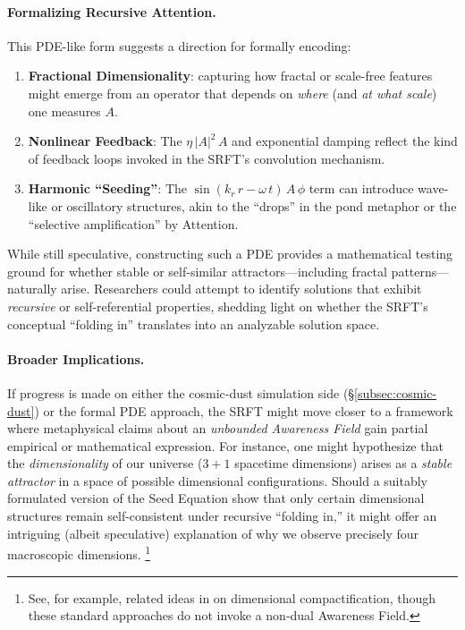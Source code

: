 \documentclass[12pt,a4paper]{article}
\begin{document}
\paragraph{Formalizing Recursive Attention.}
This PDE-like form suggests a direction for formally encoding:
\begin{enumerate}
    \item \textbf{Fractional Dimensionality}: capturing how fractal or scale-free features might emerge from an operator that depends on \emph{where} (and \emph{at what scale}) one measures \(A\).
    \item \textbf{Nonlinear Feedback}: The \(\eta\,|A|^2\,A\) and exponential damping reflect the kind of feedback loops invoked in the SRFT’s convolution mechanism.
    \item \textbf{Harmonic “Seeding”}: The \(\sin(k_r\,r - \omega\,t) \,A\,\phi\) term can introduce wave-like or oscillatory structures, akin to the “drops” in the pond metaphor or the “selective amplification” by Attention.
\end{enumerate}
While still speculative, constructing such a PDE provides a mathematical testing ground for whether stable or self-similar attractors---including fractal patterns---naturally arise. Researchers could attempt to identify solutions that exhibit \emph{recursive} or self-referential properties, shedding light on whether the SRFT’s conceptual “folding in” translates into an analyzable solution space.

\paragraph{Broader Implications.}
If progress is made on either the cosmic-dust simulation side (\S\ref{subsec:cosmic-dust}) or the formal PDE approach, the SRFT might move closer to a framework where metaphysical claims about an \emph{unbounded Awareness Field} gain partial empirical or mathematical expression. For instance, one might hypothesize that the \emph{dimensionality} of our universe (\(3+1\) spacetime dimensions) arises as a \emph{stable attractor} in a space of possible dimensional configurations. Should a suitably formulated version of the Seed Equation show that only certain dimensional structures remain self-consistent under recursive ``folding in,'' it might offer an intriguing (albeit speculative) explanation of why we observe precisely four macroscopic dimensions. \footnote{See, for example, related ideas in \cite{Witten2003, KaluzaKlein1921} on dimensional compactification, though these standard approaches do not invoke a non-dual Awareness Field.}
\end{document}
